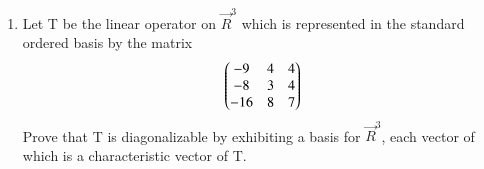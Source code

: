 \renewcommand{\theequation}{\theenumi}
\renewcommand{\thefigure}{\theenumi}
\begin{enumerate}[label=\thesubsection.\arabic*.,ref=\thesubsection.\theenumi]

\item Let T be the linear operator on $\vec{R}^3$ which is represented in the standard ordered basis by the matrix
\begin{align}
\begin{pmatrix}-9&4&4\\-8&3&4\\-16&8&7\end{pmatrix}
\label{eq:solutions/6/2/4/Q}
\end{align}
Prove that T is diagonalizable by exhibiting a basis for $\vec{R}^3$, each vector of which is a characteristic vector of T. 
%
%
\\
\solution

\end{enumerate}
